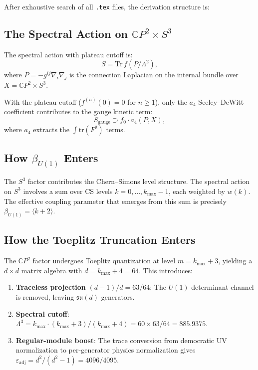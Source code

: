 \documentclass[11pt,a4paper]{article}
\theoremstyle{definition}
\begin{document}
After exhaustive search of all \texttt{.tex} files, the derivation structure is:

\subsection{The Spectral Action on $\mathbb{C}P^2 \times S^3$}

The spectral action with plateau cutoff is:
\begin{equation}
S = \mathrm{Tr}\,f(P/\Lambda^2),
\end{equation}
where $P = -g^{ij}\nabla_i\nabla_j$ is the connection Laplacian on the internal
bundle over $X = \mathbb{C}P^2 \times S^3$.

With the plateau cutoff ($f^{(n)}(0) = 0$ for $n \geq 1$), only the $a_4$
Seeley--DeWitt coefficient contributes to the gauge kinetic term:
\begin{equation}
S_{\mathrm{gauge}} \supset f_0 \cdot a_4(P, X),
\end{equation}
where $a_4$ extracts the $\int\mathrm{tr}(F^2)$ terms.

\subsection{How $\beta_{U(1)}$ Enters}

The $S^3$ factor contributes the Chern--Simons level structure.
The spectral action on $S^3$ involves a sum over CS levels $k = 0, \ldots, k_{\max}-1$,
each weighted by $w(k)$.  The effective coupling parameter that emerges from this
sum is precisely $\beta_{U(1)} = \langle k+2\rangle$.

\subsection{How the Toeplitz Truncation Enters}

The $\mathbb{C}P^2$ factor undergoes Toeplitz quantization at level $m = k_{\max}+3$,
yielding a $d \times d$ matrix algebra with $d = k_{\max}+4 = 64$.  This introduces:

\begin{enumerate}
\item \textbf{Traceless projection} $(d{-}1)/d = 63/64$: The $U(1)$ determinant
channel is removed, leaving $\mathfrak{su}(d)$ generators.

\item \textbf{Spectral cutoff}: $\Lambda^3 = k_{\max} \cdot (k_{\max}+3)/(k_{\max}+4)
= 60 \times 63/64 = 885.9375$.

\item \textbf{Regular-module boost}: The trace conversion from democratic UV
normalization to per-generator physics normalization gives
$\varepsilon_{\mathrm{adj}} = d^2/(d^2-1) = 4096/4095$.
\end{enumerate}
\end{document}
